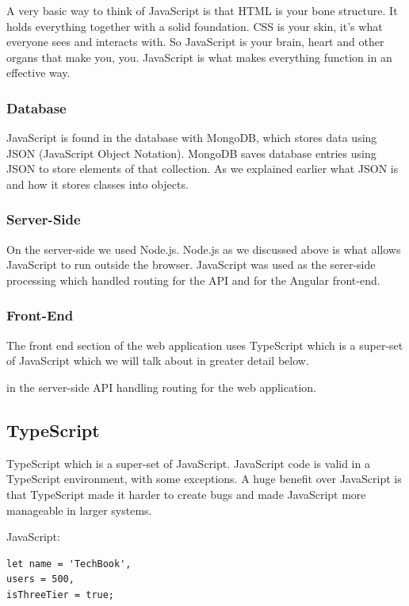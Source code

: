 A very basic way to think of JavaScript is that HTML is your bone structure. It holds everything together with a solid foundation. CSS is your skin, it's what everyone sees and interacts with. So JavaScript is your brain, heart and other organs that make you, you. JavaScript is what makes everything function in an effective way.

\subsubsection{Database}
JavaScript is found in the database with MongoDB, which stores data using JSON (JavaScript Object Notation). MongoDB saves database entries using JSON to store elements of that collection. As we explained earlier what JSON is and how it stores classes into objects.

\subsubsection{Server-Side}
On the server-side we used Node.js. Node.js as we discussed above is what allows JavaScript to run outside the browser. JavaScript was used as the serer-side processing which handled routing for the API and for the Angular front-end.

\subsubsection{Front-End}
The front end section of the web application uses TypeScript which is a super-set of JavaScript which we will talk about in greater detail below.

in the server-side API handling routing for the web application. 

\subsection{TypeScript}
TypeScript which is a super-set of JavaScript. JavaScript code is valid in a TypeScript environment, with some exceptions. A huge benefit over JavaScript is that TypeScript made it harder to create bugs and made JavaScript more manageable in larger systems.

\vspace{5mm}

JavaScript:
\begin{verbatim}
let name = 'TechBook',
users = 500,
isThreeTier = true;
\end{verbatim}

